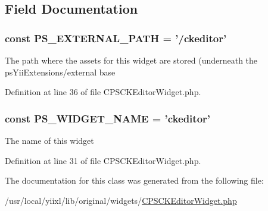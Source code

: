 \subsection{Field Documentation}
\hypertarget{classCPSCKEditorWidget_a8ccb5e1d65c091f944a6aa8c5be834ca}{
\subsubsection[{PS\_\-EXTERNAL\_\-PATH}]{\setlength{\rightskip}{0pt plus 5cm}const {\bf PS\_\-EXTERNAL\_\-PATH} = '/ckeditor'}}
\label{classCPSCKEditorWidget_a8ccb5e1d65c091f944a6aa8c5be834ca}
The path where the assets for this widget are stored (underneath the psYiiExtensions/external base 

Definition at line 36 of file CPSCKEditorWidget.php.

\hypertarget{classCPSCKEditorWidget_ae357f9dc377f7de0d12010b2ced28cbc}{
\subsubsection[{PS\_\-WIDGET\_\-NAME}]{\setlength{\rightskip}{0pt plus 5cm}const {\bf PS\_\-WIDGET\_\-NAME} = 'ckeditor'}}
\label{classCPSCKEditorWidget_ae357f9dc377f7de0d12010b2ced28cbc}
The name of this widget 

Definition at line 31 of file CPSCKEditorWidget.php.



The documentation for this class was generated from the following file:\begin{DoxyCompactItemize}
\item 
/usr/local/yiixl/lib/original/widgets/\hyperlink{CPSCKEditorWidget_8php}{CPSCKEditorWidget.php}\end{DoxyCompactItemize}
